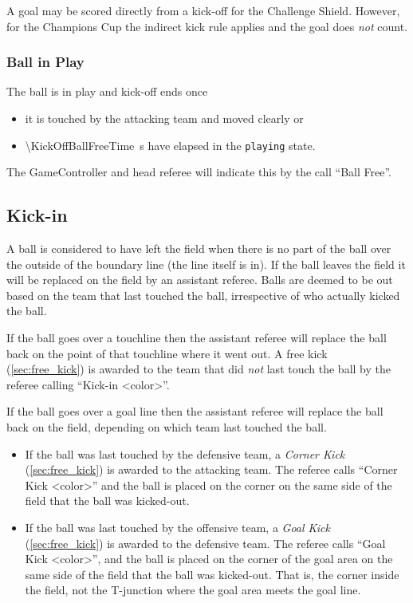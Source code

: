 A goal may be scored directly from a kick-off for the Challenge Shield. However, for the Champions Cup the indirect kick rule applies and the goal does \textit{not} count.

\subsubsection{Ball in Play}

The ball is in play and kick-off ends once
\begin{itemize}
  \item it is touched by the attacking team and moved clearly or
  \item \qty{\KickOffBallFreeTime}{\second} have elapsed in the \texttt{playing} state.
\end{itemize}

The GameController and head referee will indicate this by the call ``Ball Free''.

\subsection{Kick-in}
\label{sec:kick_in}

A ball is considered to have left the field when there is no part of the ball over the outside of the boundary line (\ie the line itself is in).
If the ball leaves the field it will be replaced on the field by an assistant referee.
Balls are deemed to be out based on the team that last touched the ball, irrespective of who actually kicked the ball.

If the ball goes over a touchline then the assistant referee will replace the ball back on the point of that touchline where it went out.
A free kick (\cf \cref{sec:free_kick}) is awarded to the team that did \emph{not} last touch the ball by the referee calling ``Kick-in \textless color\textgreater''.

If the ball goes over a goal line then the assistant referee will replace the ball back on the field, depending on which team last touched the ball.

\begin{itemize}
  \item If the ball was last touched by the defensive team, a \emph{Corner Kick} (\cf \cref{sec:free_kick}) is awarded to the attacking team.
    The referee calls ``Corner Kick \textless color\textgreater'' and the ball is placed on the corner on the same side of the field that the ball was kicked-out.
  \item If the ball was last touched by the offensive team, a \emph{Goal Kick} (\cf \cref{sec:free_kick}) is awarded to the defensive team.
    The referee calls ``Goal Kick \textless color\textgreater'', and the ball is placed on the corner of the goal area on the same side of the field that the ball was kicked-out.
    That is, the corner inside the field, not the T-junction where the goal area meets the goal line.
\end{itemize}

